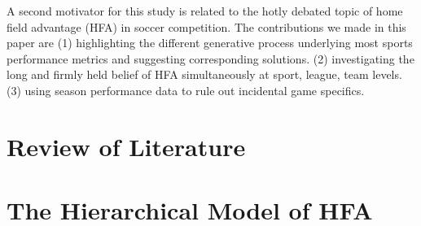 \documentclass[USenglish]{article}
\begin{document}










A second motivator for this study is related to the hotly debated topic of home field advantage (HFA) in soccer competition. The contributions we made in this paper are (1) highlighting the different generative process underlying most sports performance metrics and suggesting corresponding solutions.  (2) investigating the long and firmly held belief of HFA simultaneously at sport, league, team levels. (3) using season performance data to rule out incidental game specifics.
 
\section{Review of Literature} 

 

\section{The Hierarchical Model of HFA} 
\end{document}
